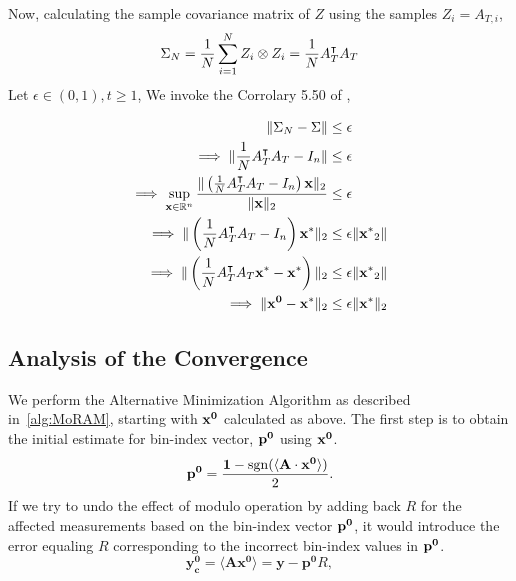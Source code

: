Now, calculating the sample covariance matrix of $Z$ using the samples $Z_i = A_{T,i}$,
$$
\Sigma_N = \frac{1}{N}\sum_{i=1}^{N}Z_i \otimes Z_i = \frac{1}{N} A_T^\intercal A_T
$$
Let $\epsilon \in (0,1), t\geq 1$,
We invoke the Corrolary 5.50 of \cite{} ,

\begin{align*}
\|\Sigma_N - \Sigma\| &\leq \epsilon \\
\implies \|\frac{1}{N} A_T^\intercal A_T - I_n\| &\leq \epsilon \\
\implies \sup_{\mathbf{x} \in {\mathbb{R}}^n} \frac{\|\left(\frac{1}{N} A_T^\intercal A_T - I_n\right)\mathbf{x}\|_2}{\|\mathbf{x}\|_2} &\leq \epsilon \\
\implies \|\left(\frac{1}{N} A_T^\intercal A_T - I_n\right)\mathbf{x^*}\|_2 &\leq \epsilon \|\mathbf{x^*}_2\| \\
\implies \|\left(\frac{1}{N} A_T^\intercal A_T\mathbf{x^*} - \mathbf{x^*}\right)\|_2 &\leq \epsilon \|\mathbf{x^*}_2\| \\
\implies \|\mathbf{x^0} - \mathbf{x^*}\|_2 &\leq \epsilon \|\mathbf{x^*}\|_2 \\
\end{align*}


\subsection{Analysis of the Convergence}
We perform the Alternative Minimization Algorithm as described in~\ref{alg:MoRAM}, starting with $\mathbf{x^0}$ calculated as above. 
The first step is to obtain the initial estimate for bin-index vector, $\mathbf{p^0}$ using $\mathbf{x^0}$.
$$
\mathbf{{p}^{0}} = \frac{\mathbf{1}-\mathrm{sgn}(\langle \mathbf{A} \cdot \mathbf{x^0} \rangle)}{2}.
$$
If we try to undo the effect of modulo operation by adding back $R$ for the affected measurements based on the bin-index vector $\mathbf{p^0}$, it would introduce the error equaling $R$ corresponding to the incorrect bin-index values in $\mathbf{p^0}$.
$$
\mathbf{y^0_c} = \langle \mathbf{A}\mathbf{x^{0}} \rangle = \mathbf{y} - \mathbf{p^0}R,
$$


